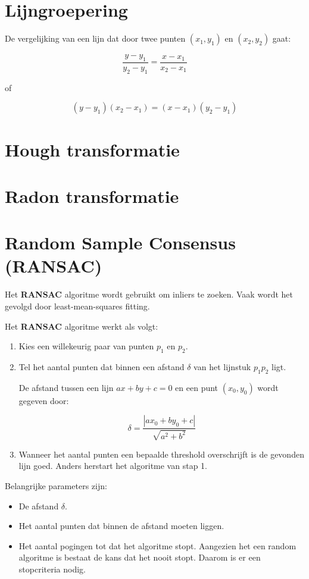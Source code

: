 \section{Lijngroepering}
De vergelijking van een lijn dat door twee punten $(x_1, y_1)$ en $(x_2, y_2)$ gaat:

$$\frac{y - y_1}{y_2 - y_1} = \frac{x - x_1}{x_2 - x_1}$$

of

$$(y - y_1)(x_2 - x_1) = (x - x_1)(y_2 - y_1)$$

\section{Hough transformatie}

\section{Radon transformatie}

\section{Random Sample Consensus (RANSAC)}
Het \textbf{RANSAC} algoritme wordt gebruikt om inliers te zoeken. Vaak wordt het gevolgd door least-mean-squares fitting.


Het \textbf{RANSAC} algoritme werkt als volgt:
\begin{enumerate}
	\item Kies een willekeurig paar van punten $p_1$ en $p_2$.
	\item Tel het aantal punten dat binnen een afstand $\delta$ van het lijnstuk $p_1p_2$ ligt. 
	
	De afstand tussen een lijn $ax + by + c = 0$ en een punt $(x_0, y_0)$ wordt gegeven door:
	
	$$\delta = \frac{|ax_0 + by_0 + c|}{\sqrt{a^2 + b^2}}$$
	\item Wanneer het aantal punten een bepaalde threshold overschrijft is de gevonden lijn goed. Anders herstart het algoritme van stap 1.
\end{enumerate} 

Belangrijke parameters zijn:
\begin{itemize}
	\item De afstand $\delta$.
	\item Het aantal punten dat binnen de afstand moeten liggen.
	\item Het aantal pogingen tot dat het algoritme stopt. Aangezien het een random algoritme is bestaat de kans dat het nooit stopt. Daarom is er een stopcriteria nodig.
\end{itemize}

